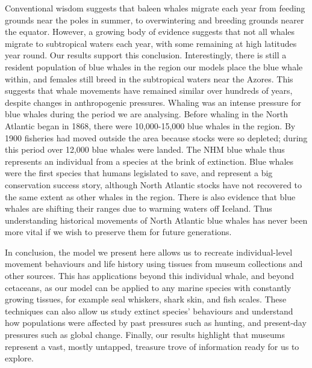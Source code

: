 \documentclass[a4paper,12pt]{article}
\begin{document}
Conventional wisdom suggests that baleen whales migrate each year from feeding grounds near the poles in summer, to overwintering and breeding grounds nearer the equator\cite{corkeron1999baleen,lockyer1981migration}. 
However, a growing body of evidence suggests that not all whales migrate to subtropical waters each year, with some remaining at high latitudes year round\cite{mcdonald2006biogeographic}. 
Our results support this conclusion. 
Interestingly, there is still a resident population of blue whales in the region our models place the blue whale within, and females still breed in the subtropical waters near the Azores\cite{reilly2008balaenoptera}. 
This suggests that whale movements have remained similar over hundreds of years, despite changes in anthropogenic pressures. 
Whaling was an intense pressure for blue whales during the period we are analysing. 
Before whaling in the North Atlantic began in 1868\cite{reilly2008balaenoptera}, there were 10,000-15,000 blue whales in the region\cite{sigurjonsson1995life}. 
By 1900 fisheries had moved outside the area because stocks were so depleted\cite{reilly2008balaenoptera}; during this period over 12,000 blue whales were landed\cite{sigurjonsson1995life}. 
The NHM blue whale thus represents an individual from a species at the brink of extinction. 
Blue whales were the first species that humans legislated to save, and represent a big conservation success story, although North Atlantic stocks have not recovered to the same extent as other whales in the region\cite{sigurjonsson1995life,pike2009note}. 
There is also evidence that blue whales are shifting their ranges due to warming waters off Iceland\cite{10.3389/fevo.2015.00006}. 
Thus understanding historical movements of North Atlantic blue whales has never been more vital if we wish to preserve them for future generations.
 
In conclusion, the model we present here allows us to recreate individual-level movement behaviours and life history using tissues from museum collections and other sources. 
This has applications beyond this individual whale, and beyond cetaceans, as our model can be applied to any marine species with constantly growing tissues, for example seal whiskers, shark skin, and fish scales. 
These techniques can also allow us study extinct species' behaviours and understand how populations were affected by past pressures such as hunting, and present-day pressures such as global change. 
Finally, our results highlight that museums represent a vast, mostly untapped, treasure trove of information ready for us to explore.
\end{document}
